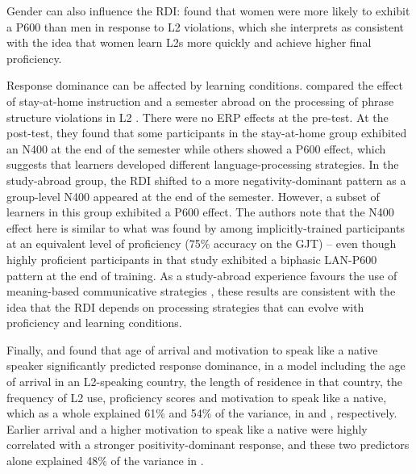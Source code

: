 \documentclass[output=paper,colorlinks,citecolor=brown,modfonts,nonflat]{../langscibook}
\begin{document}
Gender can also influence the RDI: \citet{Wampler2017} found that women were more likely to exhibit a P600 than men in response to L2  violations, which she interprets as consistent with the idea that women learn L2s more quickly and achieve higher final proficiency. 

Response dominance can be affected by learning conditions. \citet{Faretta-StutenbergMorgan-Short2018} compared the effect of stay-at-home instruction and a semester abroad on the processing of phrase structure violations in L2 . There were no ERP effects at the pre-test. At the post-test, they found that some participants in the stay-at-home group exhibited an N400 at the end of the semester while others showed a P600 effect, which suggests that learners developed different language-processing strategies. In the study-abroad group, the RDI shifted to a more negativity-dominant pattern as a group-level N400 appeared at the end of the semester. However, a subset of learners in this group exhibited a P600 effect. The authors note that the N400 effect here is similar to what was found by \citet{Morgan-ShortEtAl2010} among implicitly-trained participants at an equivalent level of proficiency (75\% accuracy on the GJT) – even though highly proficient participants in that study exhibited a biphasic LAN-P600 pattern at the end of training. As a study-abroad experience favours the use of meaning-based communicative strategies \citep{TokowiczEtAl2004}, these results are consistent with the idea that the RDI depends on processing strategies that can evolve with proficiency and learning conditions.

Finally, \citet{TannerEtAl2012} and \citet{TannerEtAl2014} found that age of arrival and motivation to speak like a native speaker significantly predicted response dominance, in a model including the age of arrival in an L2-speaking country, the length of residence in that country, the frequency of L2 use, proficiency scores and motivation to speak like a native, which as a whole explained 61\% and 54\% of the variance, in \citet{TannerEtAl2012} and \citet{TannerEtAl2014}, respectively. Earlier arrival and a higher motivation to speak like a native were highly correlated with a stronger positivity-dominant response, and these two predictors alone explained 48\% of the variance in \citet{TannerEtAl2014}.
\end{document}
